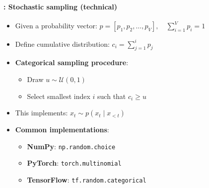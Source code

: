 \documentclass[xcolor=table]{beamer}
\begin{document}
	\begin{frame}
		\frametitle{\insertshortsubtitle}
		\framesubtitle{\insertsection: Stochastic sampling (technical)}
		
		\begin{itemize}
			
			\item Given a probability vector:
			$p = [p_1, p_2, \dots, p_V], \quad \sum_{i=1}^V p_i = 1$
			
			
			\item Define cumulative distribution:
			$c_i = \sum_{j=1}^{i} p_j$
			
			
			\item \textbf{Categorical sampling procedure}:
			\begin{itemize}
				\item Draw $u \sim \mathcal{U}(0,1)$
				\item Select smallest index $i$ such that $c_i \ge u$
			\end{itemize}
			
			\item This implements:
			$x_t \sim p(x_t \mid x_{<t})$
			
			\item \textbf{Common implementations}:
			\begin{itemize}
				\item \textbf{NumPy}: \texttt{np.random.choice}
				\item \textbf{PyTorch}: \texttt{torch.multinomial}
				\item \textbf{TensorFlow}: \texttt{tf.random.categorical}
			\end{itemize}
			
		\end{itemize}
		
	\end{frame}
	
\end{document}
